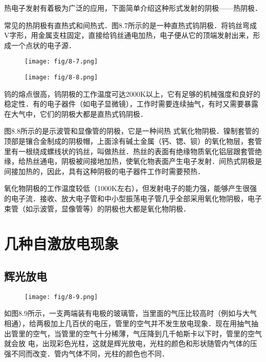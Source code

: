 热电子发射有着极为广泛的应用，下面简单介绍这种形式发射的阴极——热阴极．

常见的热阴极有直热式和间热式．图8.7所示的是一种直热式钨阴极．将钨丝弯成V字形，用金属支柱固定，直接给钨丝通电加热，电子便从它的顶端发射出来，形成一个点状的电子源．
\begin{figure}[htp]
    \centering
    \begin{minipage}[t]{0.48\textwidth}
    \centering
    \texttt{[image: fig/8-7.png]}
    \caption{}
    \end{minipage}
    \begin{minipage}[t]{0.48\textwidth}
    \centering
    \texttt{[image: fig/8-8.png]}
    \caption{}
    \end{minipage}
    \end{figure}

钨的熔点很高，钨阴极的工作温度可达2000K以上，它有足够的机械强度和良好的稳定性．有的电子器件（如电子显微镜），工作时需要连续抽气，有时又需要暴露在大气中，它们的阴极大都是直热式钨阴极．

图8.8所示的是示波管和显像管的阴极，它是一种间热
式氧化物阴极．镍制套管的顶部是镶合金制成的阴极帽，上面涂有碱土金属（钙、锶、钡）的氧化物层，套管里有一根绕成螺线状的钨丝，叫做热丝．热丝的表面有绝缘物质氧化铝层跟套管绝缘，给热丝通电，阴极被间接地加热，使氧化物表面产生电子发射．间热式阴极是间接加热的，因此，具有这种阴极的电子器件工作时需要预热．

氧化物阴极的工作温度较低（1000K左右），但发射电子的能力强，能够产生很强的电子流．接收、放大电子管和中小型振荡电子管几乎全部采用氧化物阴极，电子束管（如示波管，显像管等）的阴极也大都是氧化物阴极．

\section{几种自激放电现象}
\subsection{辉光放电}
\begin{figure}[htp]\centering
    \texttt{[image: fig/8-9.png]}
    \caption{}
    \end{figure}

如图8.9所示，一支两端装有电极的玻璃管，当里面的气压比较高时（例如与大气相通），给两极加上几百伏的电压，管里的空气并不发生放电现象．现在用抽气抽出管里的空气，当管里的空气十分稀薄，气压降到几千帕斯卡以下时，管里的空气就会放
电，出现彩色光柱，这就是辉光放电，光柱的颜色和形状随管内气体的压强不同而改变．管内气体不同，光柱的颜色也不同．

